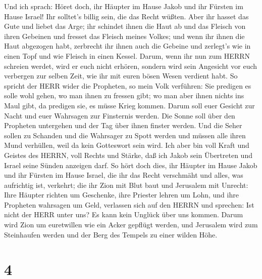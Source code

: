  Und ich sprach: Höret doch, ihr Häupter im Hause Jakob und
ihr Fürsten im Hause Israel! Ihr solltet's billig sein, die das Recht
wüßten.  Aber ihr hasset das Gute und liebet das Arge; ihr
schindet ihnen die Haut ab und das Fleisch von ihren Gebeinen
 und fresset das Fleisch meines Volkes; und wenn ihr ihnen
die Haut abgezogen habt, zerbrecht ihr ihnen auch die Gebeine und
zerlegt's wie in einen Topf und wie Fleisch in einen Kessel.
 Darum, wenn ihr nun zum HERRN schreien werdet, wird er euch
nicht erhören, sondern wird sein Angesicht vor euch verbergen zur selben
Zeit, wie ihr mit euren bösen Wesen verdient habt.  So
spricht der HERR wider die Propheten, so mein Volk verführen: Sie
predigen es solle wohl gehen, wo man ihnen zu fressen gibt; wo man aber
ihnen nichts ins Maul gibt, da predigen sie, es müsse Krieg kommen.
 Darum soll euer Gesicht zur Nacht und euer Wahrsagen zur
Finsternis werden. Die Sonne soll über den Propheten untergehen und der
Tag über ihnen finster werden.  Und die Seher sollen zu
Schanden und die Wahrsager zu Spott werden und müssen alle ihren Mund
verhüllen, weil da kein Gotteswort sein wird.  Ich aber bin
voll Kraft und Geistes des HERRN, voll Rechts und Stärke, daß ich Jakob
sein Übertreten und Israel seine Sünden anzeigen darf.  So
hört doch dies, ihr Häupter im Hause Jakob und ihr Fürsten im Hause
Israel, die ihr das Recht verschmäht und alles, was aufrichtig ist,
verkehrt;  die ihr Zion mit Blut baut und Jerusalem mit
Unrecht:  Ihre Häupter richten um Geschenke, ihre Priester
lehren um Lohn, und ihre Propheten wahrsagen um Geld, verlassen sich auf
den HERRN und sprechen: Ist nicht der HERR unter uns? Es kann kein
Unglück über uns kommen.  Darum wird Zion um euretwillen
wie ein Acker gepflügt werden, und Jerusalem wird zum Steinhaufen werden
und der Berg des Tempels zu einer wilden Höhe.

\hypertarget{section-3}{%
\section{4}\label{section-3}}

